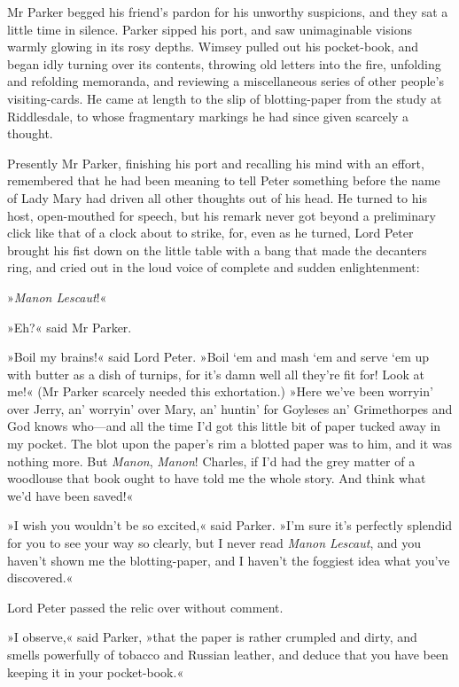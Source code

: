 Mr Parker begged his friend's pardon for his unworthy suspicions, and they sat a little time in silence. Parker sipped his port, and saw unimaginable visions warmly glowing in its rosy depths. Wimsey pulled out his pocket-book, and began idly turning over its contents, throwing old letters into the fire, unfolding and refolding memoranda, and reviewing a miscellaneous series of other people's visiting-cards. He came at length to the slip of blotting-paper from the study at Riddlesdale, to whose fragmentary markings he had since given scarcely a thought.

Presently Mr Parker, finishing his port and recalling his mind with an effort, remembered that he had been meaning to tell Peter something before the name of Lady Mary had driven all other thoughts out of his head. He turned to his host, open-mouthed for speech, but his remark never got beyond a preliminary click like that of a clock about to strike, for, even as he turned, Lord Peter brought his fist down on the little table with a bang that made the decanters ring, and cried out in the loud voice of complete and sudden enlightenment:

»\textit{Manon Lescaut}!«

»Eh?« said Mr Parker.

»Boil my brains!« said Lord Peter. »Boil `em and mash `em and serve `em up with butter as a dish of turnips, for it's damn well all they're fit for! Look at me!« (Mr Parker scarcely needed this exhortation.) »Here we've been worryin' over Jerry, an' worryin' over Mary, an' huntin' for Goyleses an' Grimethorpes and God knows who—and all the time I'd got this little bit of paper tucked away in my pocket. The blot upon the paper's rim a blotted paper was to him, and it was nothing more. But \textit{Manon}, \textit{Manon}! Charles, if I'd had the grey matter of a woodlouse that book ought to have told me the whole story. And think what we'd have been saved!«

»I wish you wouldn't be so excited,« said Parker. »I'm sure it's perfectly splendid for you to see your way so clearly, but I never read \textit{Manon Lescaut}, and you haven't shown me the blotting-paper, and I haven't the foggiest idea what you've discovered.«

Lord Peter passed the relic over without comment.

»I observe,« said Parker, »that the paper is rather crumpled and dirty, and smells powerfully of tobacco and Russian leather, and deduce that you have been keeping it in your pocket-book.«

